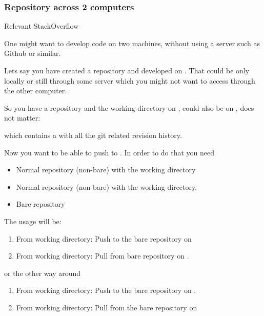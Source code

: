 \subsubsection{Repository across 2 computers}

Relevant StackOverflow 

One might want to develop code on two machines, without using a server such as Github or similar.

Lets say you have created a repository and developed on . That could be only locally or still through some server which you might not want to access through the other computer.

So you have a repository and the working directory on , could also be on , does not matter:


which contains a  with all the git related revision history.

Now you want to be able to push to . In order to do that you need

\begin{itemize}
    \item Normal repository (non-bare) with the working directory
\end{itemize}

\begin{itemize}
    \item Normal repository (non-bare) with the working directory.
    \item Bare repository
\end{itemize}

The usage will be:

\begin{enumerate}
    \item From  working directory: Push to the bare repository on 
    \item From  working directory: Pull from bare repository on .
\end{enumerate}

or the other way around

\begin{enumerate}
    \item From  working directory: Push to the bare repository on .
    \item From  working directory: Pull from the bare repository on 
\end{enumerate}

